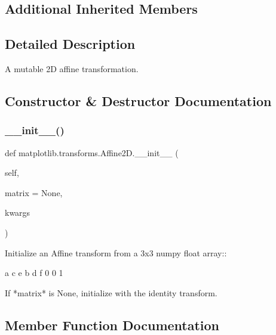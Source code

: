 \subsection*{Additional Inherited Members}


\subsection{Detailed Description}
\begin{DoxyVerb}A mutable 2D affine transformation.
\end{DoxyVerb}
 

\subsection{Constructor \& Destructor Documentation}
\mbox{\label{classmatplotlib_1_1transforms_1_1Affine2D_a2bd50b6320319e569e13a2b64d92758a}} 
\subsubsection{\texorpdfstring{\+\_\+\+\_\+init\+\_\+\+\_\+()}{\_\_init\_\_()}}
{\footnotesize\ttfamily def matplotlib.\+transforms.\+Affine2\+D.\+\_\+\+\_\+init\+\_\+\+\_\+ (\begin{DoxyParamCaption}\item[{}]{self,  }\item[{}]{matrix = {\ttfamily None},  }\item[{}]{kwargs }\end{DoxyParamCaption})}

\begin{DoxyVerb}Initialize an Affine transform from a 3x3 numpy float array::

  a c e
  b d f
  0 0 1

If *matrix* is None, initialize with the identity transform.
\end{DoxyVerb}
 

\subsection{Member Function Documentation}
\mbox{\label{classmatplotlib_1_1transforms_1_1Affine2D_afa6b95055417d3d465cc543a3a16ac4e}} 
